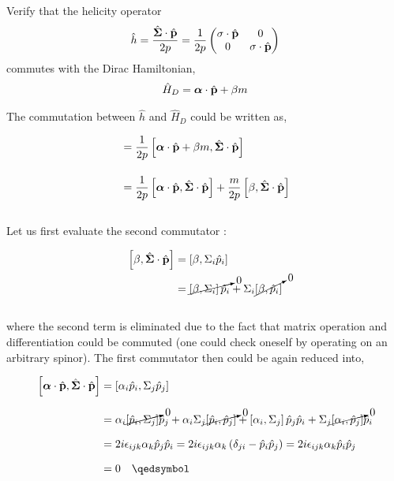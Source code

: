 \begin{problem}{4.12}
Verify that the helicity operator
\begin{align*}
    \hat{h} = \frac{\hat{\boldsymbol{\Sigma}}\cdot\hat{\mathbf{p}}}{2p} = \frac{1}{2p}
    \begin{pmatrix}
        \boldmath{\sigma}\cdot\hat{\mathbf{p}} & 0 \\
        0 & \boldmath{\sigma}\cdot\hat{\mathbf{p}}
    \end{pmatrix}
\end{align*}
commutes with the Dirac Hamiltonian,
\begin{align*}
    \hat{H}_D = \boldsymbol{\alpha}\cdot\hat{\mathbf{p}} + \beta m
\end{align*}
\end{problem}
\begin{solution}
The commutation between $\hat{h}$ and $\hat{H}_D$ could be written as,

\begin{align*}
    [ \hat{H}_D , \hat{h} ] &= \frac{1}{2p} \left[\boldsymbol{\alpha}\cdot\hat{\boldp} + \beta m,  \hat{\boldsymbol{\Sigma}}\cdot\hat{\boldp} \right] \\[0.15in]
                            &= \frac{1}{2p}   \left[ \boldsymbol{\alpha}\cdot\hat{\boldp} , \hat{\boldsymbol{\Sigma}}\cdot\hat{\boldp}   \right] + \frac{m}{2p} \left[\beta,\hat{\boldsymbol{\Sigma}}\cdot\hat{\boldp} \right] 
\end{align*}\\
Let us first evaluate the second commutator : 

\begin{align*}
    \left[\beta,\hat{\boldsymbol{\Sigma}}\cdot\hat{\mathbf{p}} \right] &= \left[\beta,\Sigma_i \hat{p}_i\right] \\
    &= \cancelto{0}{\left[\beta,\Sigma_i\right]\hat{p}_i} + \Sigma_i \cancelto{0}{\left[ \beta,\hat{p}_i \right]}
\end{align*}\\
where the second term is eliminated due to the fact that matrix operation and differentiation could be commuted (one could check oneself by operating on an arbitrary spinor). The first commutator then could be again reduced into,

\begin{align*}
    \left[ \boldsymbol{\alpha}\cdot\hat{\boldp} , \hat{\boldsymbol{\Sigma}}\cdot\hat{\boldp}   \right] &= \left[ \alpha_i\hat{p}_i , \Sigma_j \hat{p}_j \right] \\[0.1in]
    &= \alpha_i \cancelto{0}{\left[ \hatp_i,\Sigma_j \right]}\hatp_j + \alpha_i \Sigma_j \cancelto{0}{\left[ \hatp_i,\hatp_j \right]} + \left[\alpha_i,\Sigma_j\right]\hatp_j\hatp_i + \Sigma_j \cancelto{0}{\left[ \alpha_i,\hatp_j \right]} \hatp_i \\[0.1in]
    &=  2i \epsilon_{ijk}\alpha_k \hatp_j \hatp_i    = 2i\epsilon_{ijk}\alpha_k \left(\delta_{ji} - \hatp_i\hatp_j\right) = 2i \epsilon_{ijk}\alpha_k \hatp_i \hatp_j \\[0.1in]
    &= 0 \qed 
\end{align*}
\end{solution}


